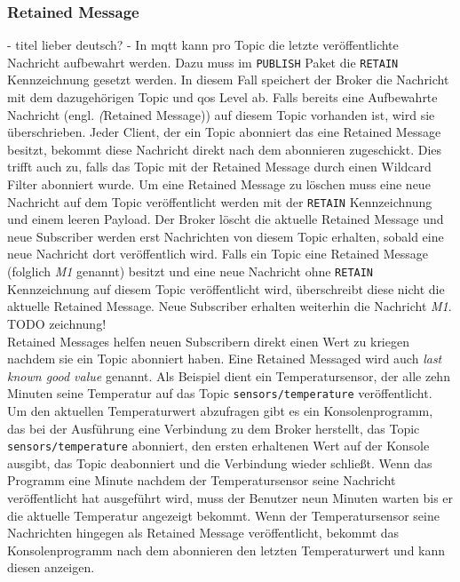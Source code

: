\subsubsection{Retained Message} - titel lieber deutsch? -
In \ac{mqtt} kann pro Topic die letzte veröffentlichte Nachricht aufbewahrt werden.
Dazu muss im \verb|PUBLISH| Paket die \verb|RETAIN| Kennzeichnung gesetzt werden.
In diesem Fall speichert der Broker die Nachricht mit dem dazugehörigen Topic und \ac{qos} Level ab.
Falls bereits eine Aufbewahrte Nachricht (engl. \textit(Retained Message)) auf diesem Topic vorhanden ist, wird sie überschrieben.
Jeder Client, der ein Topic abonniert das eine Retained Message besitzt, bekommt diese Nachricht direkt nach dem abonnieren zugeschickt.
Dies trifft auch zu, falls das Topic mit der Retained Message durch einen Wildcard Filter abonniert wurde.
\cite{teamRetainedMessagesMQTT}
Um eine Retained Message zu löschen muss eine neue Nachricht auf dem Topic veröffentlicht werden mit der \verb|RETAIN| Kennzeichnung und einem leeren Payload. Der Broker löscht die aktuelle Retained Message und neue Subscriber werden erst Nachrichten von diesem Topic erhalten, sobald eine neue Nachricht dort veröffentlich wird.
Falls ein Topic eine Retained Message (folglich \textit{M1} genannt) besitzt und eine neue Nachricht ohne \verb|RETAIN| Kennzeichnung auf diesem Topic veröffentlicht wird, überschreibt diese nicht die aktuelle Retained Message. Neue Subscriber erhalten weiterhin die Nachricht \textit{M1}. TODO zeichnung!
\cite{mqtt5Specification}
\\
Retained Messages helfen neuen Subscribern direkt einen Wert zu kriegen nachdem sie ein Topic abonniert haben. Eine Retained Messaged wird auch \textit{last known good value} genannt.
\cite{teamRetainedMessagesMQTT}
Als Beispiel dient ein Temperatursensor, der alle zehn Minuten seine Temperatur auf das Topic \verb|sensors/temperature| veröffentlicht. Um den aktuellen Temperaturwert abzufragen gibt es ein Konsolenprogramm, das bei der Ausführung eine Verbindung zu dem Broker herstellt, das Topic \verb|sensors/temperature| abonniert, den ersten erhaltenen Wert auf der Konsole ausgibt, das Topic deabonniert und die Verbindung wieder schlie{\ss}t. Wenn das Programm eine Minute nachdem der Temperatursensor seine Nachricht veröffentlicht hat ausgeführt wird, muss der Benutzer neun Minuten warten bis er die aktuelle Temperatur angezeigt bekommt. Wenn der Temperatursensor seine Nachrichten hingegen als Retained Message veröffentlicht, bekommt das Konsolenprogramm nach dem abonnieren den letzten Temperaturwert und kann diesen anzeigen.

